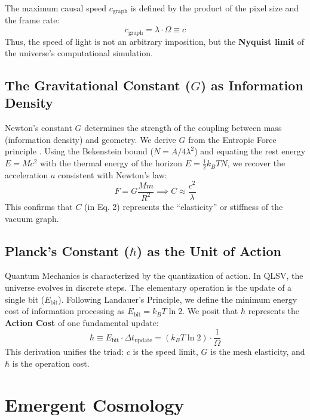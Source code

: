 \documentclass[11pt, a4paper]{article}
\begin{document}
The maximum causal speed $c_{\text{graph}}$ is defined by the product of the pixel size and the frame rate:
\begin{equation}
    c_{\text{graph}} = \lambda \cdot \Omega \equiv c
\end{equation}
Thus, the speed of light is not an arbitrary imposition, but the \textbf{Nyquist limit} of the universe's computational simulation.

\subsection{The Gravitational Constant ($G$) as Information Density}
Newton's constant $G$ determines the strength of the coupling between mass (information density) and geometry. We derive $G$ from the Entropic Force principle \cite{verlinde2011}.
Using the Bekenstein bound ($N = A/4\lambda^2$) and equating the rest energy $E=Mc^2$ with the thermal energy of the horizon $E = \frac{1}{2} k_B T N$, we recover the acceleration $a$ consistent with Newton's law:
\begin{equation}
    F = G \frac{Mm}{R^2} \implies C \approx \frac{c^2}{\lambda}
\end{equation}
This confirms that $C$ (in Eq. 2) represents the ``elasticity'' or stiffness of the vacuum graph.

\subsection{Planck's Constant ($\hbar$) as the Unit of Action}
Quantum Mechanics is characterized by the quantization of action. In QLSV, the universe evolves in discrete steps. The elementary operation is the update of a single bit ($E_{\text{bit}}$). Following Landauer's Principle, we define the minimum energy cost of information processing as $E_{\text{bit}} = k_B T \ln 2$.
We posit that $\hbar$ represents the \textbf{Action Cost} of one fundamental update:
\begin{equation}
    \hbar \equiv E_{\text{bit}} \cdot \Delta t_{\text{update}} = (k_B T \ln 2) \cdot \frac{1}{\Omega}
\end{equation}
This derivation unifies the triad: $c$ is the speed limit, $G$ is the mesh elasticity, and $\hbar$ is the operation cost.

\section{Emergent Cosmology}
\end{document}
